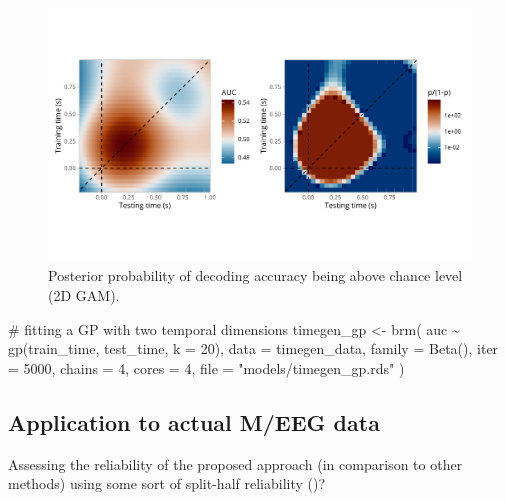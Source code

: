\documentclass[
  doc,
  floatsintext,
  longtable,
  a4paper,
  nolmodern,
  notxfonts,
  notimes,
  colorlinks=true,linkcolor=blue,citecolor=blue,urlcolor=blue]{apa7}
\newenvironment{Shaded}{\begin{snugshade}}{\end{snugshade}}
\newcommand{\AttributeTok}[1]{\textcolor[rgb]{0.40,0.45,0.13}{#1}}
\newcommand{\CommentTok}[1]{\textcolor[rgb]{0.37,0.37,0.37}{#1}}
\newcommand{\DecValTok}[1]{\textcolor[rgb]{0.68,0.00,0.00}{#1}}
\newcommand{\FunctionTok}[1]{\textcolor[rgb]{0.28,0.35,0.67}{#1}}
\newcommand{\NormalTok}[1]{\textcolor[rgb]{0.00,0.23,0.31}{#1}}
\newcommand{\OtherTok}[1]{\textcolor[rgb]{0.00,0.23,0.31}{#1}}
\newcommand{\SpecialCharTok}[1]{\textcolor[rgb]{0.37,0.37,0.37}{#1}}
\newcommand{\StringTok}[1]{\textcolor[rgb]{0.13,0.47,0.30}{#1}}
\begin{document}
\begin{figure}[H]

\caption{Posterior probability of decoding accuracy being above chance
level (2D GAM).}

{\centering \includegraphics[width=1\textwidth,height=\textheight]{brms_meeg_files/figure-pdf/gam-timegen-post-preds-1.pdf}

}

\end{figure}%

\begin{Shaded}
\begin{Highlighting}[]
\CommentTok{\# fitting a GP with two temporal dimensions}
\NormalTok{timegen\_gp }\OtherTok{\textless{}{-}} \FunctionTok{brm}\NormalTok{(}
\NormalTok{    auc }\SpecialCharTok{\textasciitilde{}} \FunctionTok{gp}\NormalTok{(train\_time, test\_time, }\AttributeTok{k =} \DecValTok{20}\NormalTok{),}
    \AttributeTok{data =}\NormalTok{ timegen\_data,}
    \AttributeTok{family =} \FunctionTok{Beta}\NormalTok{(),}
    \AttributeTok{iter =} \DecValTok{5000}\NormalTok{,}
    \AttributeTok{chains =} \DecValTok{4}\NormalTok{,}
    \AttributeTok{cores =} \DecValTok{4}\NormalTok{,}
    \AttributeTok{file =} \StringTok{"models/timegen\_gp.rds"}
\NormalTok{    )}
\end{Highlighting}
\end{Shaded}

\subsection{Application to actual M/EEG
data}\label{application-to-actual-meeg-data}

Assessing the reliability of the proposed approach (in comparison to
other methods) using some sort of split-half reliability
()?
\end{document}
